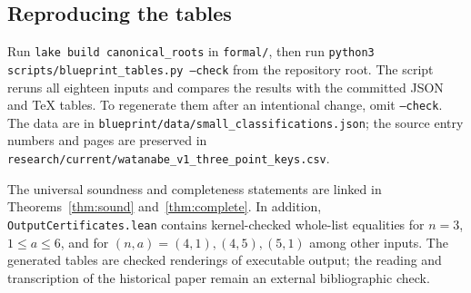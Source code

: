 \subsection{Reproducing the tables}
Run \texttt{lake build canonical\_roots} in \texttt{formal/}, then run \texttt{python3 scripts/blueprint\_tables.py --check} from the repository root. The script reruns all eighteen inputs and compares the results with the committed JSON and TeX tables. To regenerate them after an intentional change, omit \texttt{--check}. The data are in \texttt{blueprint/data/small\_classifications.json}; the source entry numbers and pages are preserved in \texttt{research/current/watanabe\_v1\_three\_point\_keys.csv}.

The universal soundness and completeness statements are linked in Theorems~\ref{thm:sound} and~\ref{thm:complete}. In addition, \texttt{OutputCertificates.lean} contains kernel-checked whole-list equalities for $n=3$, $1\leq a\leq6$, and for $(n,a)=(4,1),(4,5),(5,1)$ among other inputs. The generated tables are checked renderings of executable output; the reading and transcription of the historical paper remain an external bibliographic check.
